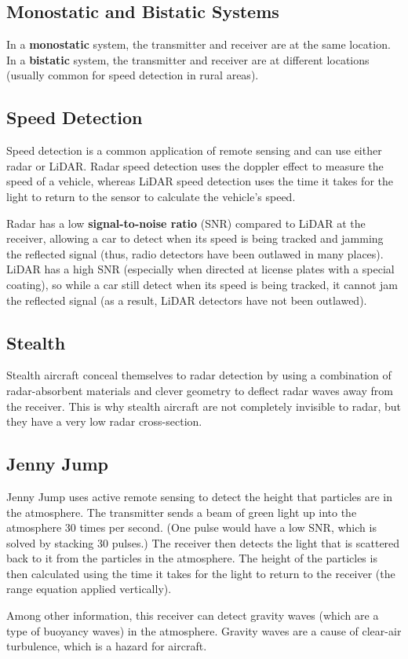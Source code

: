 \subsection{Monostatic and Bistatic Systems}

In a \textbf{monostatic} system, the transmitter and receiver are at the same location. In a \textbf{bistatic} system, the transmitter and receiver are at different locations (usually common for speed detection in rural areas).

\subsection{Speed Detection}

Speed detection is a common application of remote sensing and can use either radar or LiDAR. Radar speed detection uses the doppler effect to measure the speed of a vehicle, whereas LiDAR speed detection uses the time it takes for the light to return to the sensor to calculate the vehicle's speed.

\vsp

Radar has a low \textbf{signal-to-noise ratio} (SNR) compared to LiDAR at the receiver, allowing a car to detect when its speed is being tracked and jamming the reflected signal (thus, radio detectors have been outlawed in many places). LiDAR has a high SNR (especially when directed at license plates with a special coating), so while a car still detect when its speed is being tracked, it cannot jam the reflected signal (as a result, LiDAR detectors have not been outlawed).

\subsection{Stealth}

Stealth aircraft conceal themselves to radar detection by using a combination of radar-absorbent materials and clever geometry to deflect radar waves away from the receiver. This is why stealth aircraft are not completely invisible to radar, but they have a very low radar cross-section.

\subsection{Jenny Jump}

Jenny Jump uses active remote sensing to detect the height that particles are in the atmosphere. The transmitter sends a beam of green light up into the atmosphere 30 times per second. (One pulse would have a low SNR, which is solved by stacking 30 pulses.) The receiver then detects the light that is scattered back to it from the particles in the atmosphere. The height of the particles is then calculated using the time it takes for the light to return to the receiver (the range equation applied vertically).

\vsp

Among other information, this receiver can detect gravity waves (which are a type of buoyancy waves) in the atmosphere. Gravity waves are a cause of clear-air turbulence, which is a hazard for aircraft.